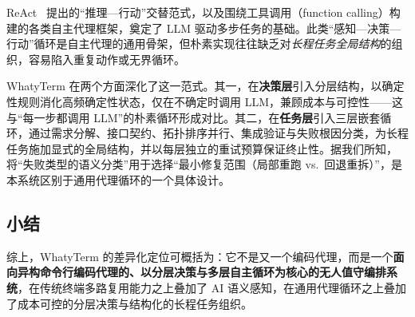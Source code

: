 ReAct~\cite{yao2023react} 提出的“推理—行动”交替范式，以及围绕工具调用（function calling）构建的各类自主代理框架，奠定了 LLM 驱动多步任务的基础。此类“感知—决策—行动”循环是自主代理的通用骨架，但朴素实现往往缺乏对\emph{长程任务全局结构}的组织，容易陷入重复动作或无界循环。

WhatyTerm 在两个方面深化了这一范式。其一，在\textbf{决策层}引入分层结构，以确定性规则消化高频确定性状态，仅在不确定时调用 LLM，兼顾成本与可控性——这与“每一步都调用 LLM”的朴素循环形成对比。其二，在\textbf{任务层}引入三层嵌套循环，通过需求分解、接口契约、拓扑排序并行、集成验证与失败根因分类，为长程任务施加显式的全局结构，并以每层独立的重试预算保证终止性。据我们所知，将“失败类型的语义分类”用于选择“最小修复范围（局部重跑 vs.\ 回退重拆）”，是本系统区别于通用代理循环的一个具体设计。

\subsection{小结}

综上，WhatyTerm 的差异化定位可概括为：它不是又一个编码代理，而是一个\textbf{面向异构命令行编码代理的、以分层决策与多层自主循环为核心的无人值守编排系统}，在传统终端多路复用能力之上叠加了 AI 语义感知，在通用代理循环之上叠加了成本可控的分层决策与结构化的长程任务组织。
